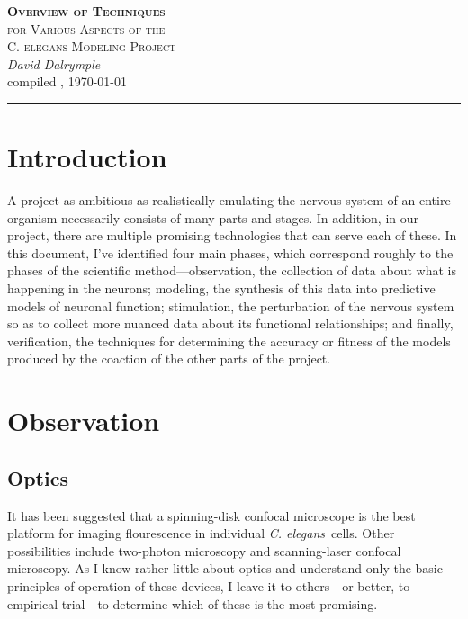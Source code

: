 \documentclass[letter,11pt]{article}
\newcommand{\cel}{{\em C. elegans}}
\begin{document}
\begin{center}
  \textsc{\LARGE \textbf{Overview of Techniques} \\[0.5mm] for Various Aspects of the \\[2.8mm] C. elegans Modeling Project}\\[3mm]
	\textit{\Large David Dalrymple}\\[2mm]
	{\large compiled \currenttime, \today\\[0mm]}
	\rule[2mm]{0.66\textwidth}{0.25mm}
\end{center}

\section*{Introduction}

A project as ambitious as realistically emulating the nervous system of an entire organism
necessarily consists of many parts and stages. In addition, in our project, there are
multiple promising technologies that can serve each of these. In this document, I've
identified four main phases, which correspond roughly to the phases of the scientific
method---observation, the collection of data about what is happening in the neurons;
modeling, the synthesis of this data into predictive models of neuronal function;
stimulation, the perturbation of the nervous system so as to collect more nuanced
data about its functional relationships; and finally, verification, the techniques
for determining the accuracy or fitness of the models produced by the coaction
of the other parts of the project.

\tableofcontents

\section{Observation}


\subsection{Optics}
\label{optics1}

It has been suggested that a spinning-disk confocal microscope is the best
platform for imaging flourescence in individual \cel\ cells.  Other
possibilities include two-photon microscopy and scanning-laser confocal
microscopy. As I know rather little about optics and understand only the basic
principles of operation of these devices, I leave it to others---or better, to
empirical trial---to determine which of these is the most promising.
\end{document}
